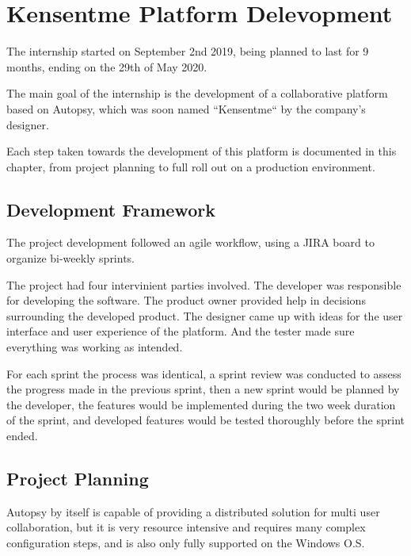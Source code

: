 
\chapter{Kensentme Platform Delevopment}
\label{ch:development}

The internship started on September 2nd 2019, being planned to last for 9 months, ending on the 29th of May 2020.

The main goal of the internship is the development of a collaborative platform based on Autopsy, which was soon named ``Kensentme`` by the company's designer.

Each step taken towards the development of this platform is documented in this chapter, from project planning to full roll out on a production environment.

\section{Development Framework}

The project development followed an agile workflow, using a JIRA board to organize bi-weekly sprints.

The project had four intervinient parties involved. The developer was responsible for developing the software. The product owner provided help in decisions surrounding the developed product. 
The designer came up with ideas for the user interface and user experience of the platform. And the tester made sure everything was working as intended.

For each sprint the process was identical, a sprint review was conducted to assess the progress made in the previous sprint, then a new sprint would be planned by the developer, 
the features would be implemented during the two week duration of the sprint, and developed features would be tested thoroughly before the sprint ended.

\section{Project Planning}

Autopsy by itself is capable of providing a distributed solution for multi user collaboration, but it is very resource intensive and requires many complex configuration steps,
and is also only fully supported on the Windows O.S.

